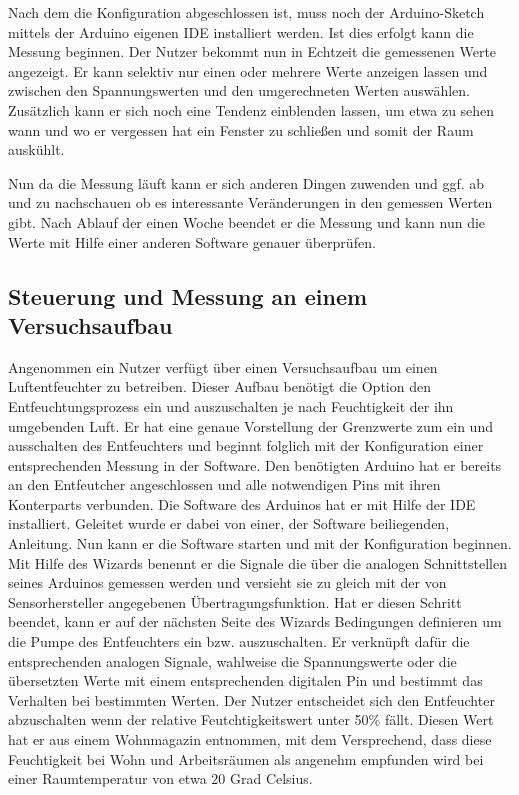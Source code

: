 Nach dem die Konfiguration abgeschlossen ist, muss noch der Arduino-Sketch mittels der Arduino eigenen \acrshort{IDE} installiert werden. Ist dies erfolgt kann die Messung beginnen. Der Nutzer bekommt nun in Echtzeit die gemessenen Werte angezeigt. Er kann selektiv nur einen oder mehrere Werte anzeigen lassen und zwischen den Spannungswerten und den umgerechneten Werten auswählen. Zusätzlich kann er sich noch eine Tendenz einblenden lassen, um etwa zu sehen wann und wo er vergessen hat ein Fenster zu schließen und somit der Raum auskühlt. 

Nun da die Messung läuft kann er sich anderen Dingen zuwenden und ggf. ab und zu nachschauen ob es interessante Veränderungen in den gemessen Werten gibt.
Nach Ablauf der einen Woche beendet er die Messung und kann nun die Werte mit Hilfe einer anderen Software genauer überprüfen.
\subsection{Steuerung und Messung an einem Versuchsaufbau}
Angenommen ein Nutzer verfügt über einen Versuchsaufbau um einen Luftentfeuchter zu betreiben. Dieser Aufbau benötigt die Option den Entfeuchtungsprozess ein und auszuschalten je nach Feuchtigkeit der ihn umgebenden Luft. Er hat eine genaue Vorstellung der Grenzwerte zum ein und ausschalten des Entfeuchters und beginnt folglich mit der Konfiguration einer entsprechenden Messung in der Software. Den benötigten Arduino hat er bereits an den Entfeutcher angeschlossen und alle notwendigen Pins mit ihren Konterparts verbunden. Die Software des Arduinos hat er mit Hilfe der \acrshort{IDE} installiert. Geleitet wurde er dabei von einer, der Software beiliegenden, Anleitung. Nun kann er die Software starten und mit der Konfiguration beginnen.
Mit Hilfe des Wizards benennt er die Signale die über die analogen Schnittstellen seines Arduinos gemessen werden und versieht sie zu gleich mit der von Sensorhersteller angegebenen Übertragungsfunktion. Hat er diesen Schritt beendet, kann er auf der nächsten Seite des Wizards Bedingungen definieren um die Pumpe des Entfeuchters ein bzw. auszuschalten. Er verknüpft dafür die entsprechenden analogen Signale, wahlweise die Spannungswerte oder die übersetzten Werte mit einem entsprechenden digitalen Pin und bestimmt das Verhalten bei bestimmten Werten. Der Nutzer entscheidet sich den Entfeuchter abzuschalten wenn der relative Feutchtigkeitswert unter 50\% fällt. Diesen Wert hat er aus einem Wohnmagazin entnommen, mit dem Versprechend, dass diese Feuchtigkeit bei Wohn und Arbeitsräumen als angenehm empfunden wird bei einer Raumtemperatur von etwa 20 Grad Celsius. 

